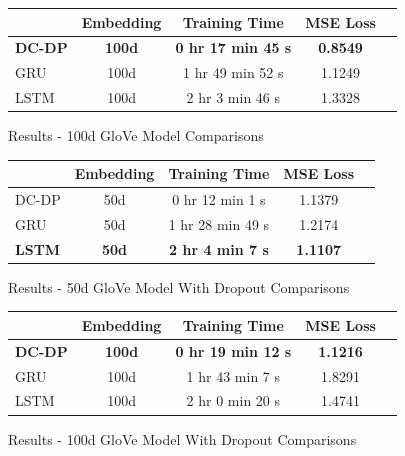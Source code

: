 \documentclass[10pt, twocolumn, letterpaper]{article}
\begin{document}
\begin{figure}[!h]
\begin{center}
{\small
\begin{tabular}{l|cccc}
\hline
 & Embedding & Training Time & MSE Loss \\
\hline
\textbf{DC-DP} & \textbf{100d} & \textbf{0 hr 17 min 45 s} & \textbf{0.8549} \\
GRU & 100d & 1 hr 49 min 52 s & 1.1249 \\
LSTM & 100d & 2 hr 3 min 46 s & 1.3328 \\

\hline
\end{tabular}
}
\end{center}
\caption{Results - 100d GloVe Model Comparisons}
\end{figure}

\begin{figure}[!h]
\begin{center}
{\small
\begin{tabular}{l|cccc}
\hline
 & Embedding & Training Time & MSE Loss \\
\hline
DC-DP & 50d & 0 hr 12 min 1 s & 1.1379 \\
GRU & 50d & 1 hr 28 min 49 s & 1.2174 \\
\textbf{LSTM} & \textbf{50d} & \textbf{2 hr 4 min 7 s} & \textbf{1.1107} \\

\hline
\end{tabular}
}
\end{center}
\caption{Results - 50d GloVe Model With Dropout Comparisons}
\end{figure}

\begin{figure}[!h]
\begin{center}
{\small
\begin{tabular}{l|cccc}
\hline
 & Embedding & Training Time & MSE Loss \\
\hline
\textbf{DC-DP} & \textbf{100d} & \textbf{0 hr 19 min 12 s} & \textbf{1.1216} \\
GRU & 100d & 1 hr 43 min 7 s & 1.8291 \\
LSTM & 100d & 2 hr 0 min 20 s & 1.4741 \\

\hline
\end{tabular}
}
\end{center}
\caption{Results - 100d GloVe Model With Dropout Comparisons}
\end{figure}
\end{document}
